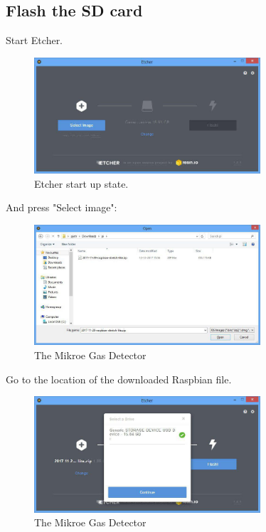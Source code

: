 \documentclass[11pt]{report}
\begin{document}
		\subsection{Flash the SD card}
			Start Etcher.
			\begin{figure}[ht]
				\centering
				\includegraphics[width=0.75\textwidth]{images/pi/install_etcher_2.jpg} 
				\caption{Etcher start up state.}
			\end{figure}
			\newpage
			And press "Select image":
			\begin{figure}[ht]
				\centering
				\includegraphics[width=0.75\textwidth]{images/pi/install_etcher_3.jpg} 
				\caption{The Mikroe Gas Detector}
			\end{figure}
			Go to the location of the downloaded Raspbian file.\\
		\begin{figure}[ht]
			\centering
			\includegraphics[width=0.75\textwidth]{images/pi/install_etcher_4.jpg} 
			\caption{The Mikroe Gas Detector}
		\end{figure}
\end{document}
